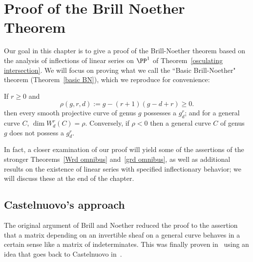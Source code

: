 

\chapter{Proof of the Brill Noether Theorem}\label{Brill Noether proof chapter}
\label{BrillNoetherproofChapter}

Our goal in this chapter is to give a proof of the Brill-Noether theorem based on the analysis
of inflections of linear series on $\PP^{1}$ of Theorem~\ref{osculating intersection}. We will focus on proving what we call the ``Basic Brill-Noether" theorem (Theorem~\ref{basic BN}), which we reproduce for convenience:

\begin{theorem}\label{BN-basic}
If $r\geq 0$ and
 $$
 \rho(g,r,d) := g - (r+1)(g-d+r) \geq 0.
$$
then every smooth projective curve of genus $g$  possesses a $g^r_d$; and for a general curve $C$,  $\dim W^r_d(C) = \rho$. Conversely, if $\rho < 0$ then a general curve $C$ of genus $g$ does not possess a $g^r_d$.
\end{theorem}

In fact, a closer examination of our proof will yield some of the assertions of the stronger Theorems~\ref{Wrd omnibus} and~\ref{grd omnibus}, as well as additional results on the existence of linear series with specified inflectionary behavior; we will discuss these at the end of the chapter.


\section{Castelnuovo's approach}

The original argument of Brill and Noether reduced the proof to the assertion that a matrix depending
on an invertible sheaf on a general curve
behaves in a certain sense like a matrix of indeterminates. This was finally proven in~\cite{Griffiths-Harris-BN} using an idea that goes back to Castelnuovo in~\cite{zbMATH02692307}.

